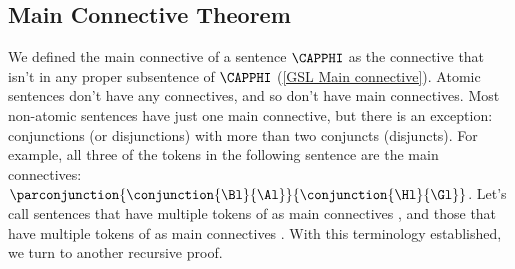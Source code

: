 \subsection{Main Connective Theorem}\label{additional recur examples} 

We defined the main connective of a sentence $\CAPPHI$ as the connective that isn't in any proper subsentence of $\CAPPHI$ (\ref{GSL Main connective}).  Atomic sentences don't have any connectives, and so don't have main connectives.  Most non-atomic sentences have just one main connective, but there is an exception: conjunctions (or disjunctions) with more than two conjuncts (disjuncts). For example, all three of the \mention{$\WEDGE$} tokens in the following sentence are the main connectives: $\parconjunction{\conjunction{\Bl}{\Al}}{\conjunction{\Hl}{\Gl}}$.  Let's call sentences that have multiple tokens of \mention{$\WEDGE$} as main connectives , and those that have multiple tokens of \mention{$\VEE$} as main connectives .  With this terminology established, we turn to another recursive proof.

